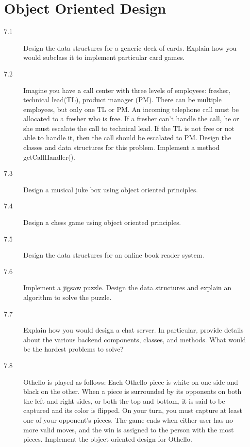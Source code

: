 \chapter{Object Oriented Design}

\begin{description}
\item[7.1] Design the data structures for a generic deck of cards. Explain how you would subclass it to implement particular card games.
%

\item[7.2] Imagine you have a call center with three levels of employees: fresher, technical lead(TL), product manager (PM). There can be multiple employees, but only one TL or PM. An incoming telephone call must be allocated to a fresher who is free. If a fresher can’t handle the call, he or she must escalate the call to technical lead. If the TL is not free or not able to handle it, then the call should be escalated to PM. Design the classes and data structures for this problem. Implement a method getCallHandler().
%

\item[7.3] Design a musical juke box using object oriented principles.
%

\item[7.4] Design a chess game using object oriented principles.
%

\item[7.5] Design the data structures for an online book reader system.
%

\item[7.6] Implement a jigsaw puzzle. Design the data structures and explain an algorithm to solve the puzzle.
%

\item[7.7] Explain how you would design a chat server. In particular, provide details about the various backend components, classes, and methods. What would be the hardest problems to solve?
%

\item[7.8] Othello is played as follows: Each Othello piece is white on one side and black on the other. When a piece is surrounded by its opponents on both the left and right sides, or both the top and bottom, it is said to be captured and its color is flipped. On your turn, you must capture at least one of your opponent’s pieces. The game ends when either user has no more valid moves, and the win is assigned to the person with the most pieces. Implement the object oriented design for Othello.
%


\end{description}
